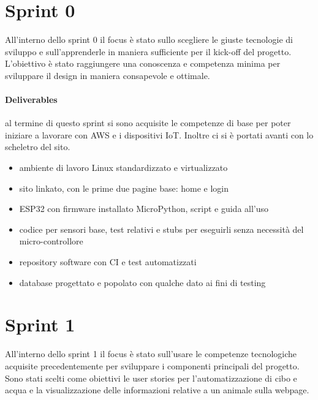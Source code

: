 \section{Sprint 0}
All'interno dello sprint 0 il focus è stato sullo scegliere le giuste tecnologie di sviluppo e sull'apprenderle in maniera sufficiente per il kick-off del progetto.
L'obiettivo è stato raggiungere una conoscenza e competenza minima per sviluppare il design in maniera consapevole e ottimale.
\paragraph{Deliverables} 
al termine di questo sprint si sono acquisite le competenze di base per poter iniziare a lavorare con AWS e i dispositivi IoT. Inoltre ci si è portati avanti con lo scheletro del sito.
\begin{itemize}
    \item ambiente di lavoro Linux standardizzato e virtualizzato
    \item sito linkato, con le prime due pagine base: home e login
    \item ESP32 con firmware installato MicroPython, script e guida all'uso
    \item codice per sensori base, test relativi e stubs per eseguirli senza necessità del micro-controllore
    \item repository software con CI e test automatizzati 
    \item database progettato e popolato con qualche dato ai fini di testing
\end{itemize}

\section{Sprint 1}
All'interno dello sprint 1 il focus è stato sull'usare le competenze tecnologiche acquisite precedentemente per sviluppare i componenti principali del progetto. Sono stati scelti come obiettivi le user stories per l'automatizzazione di cibo e acqua e la visualizzazione delle informazioni relative a un animale sulla webpage.
